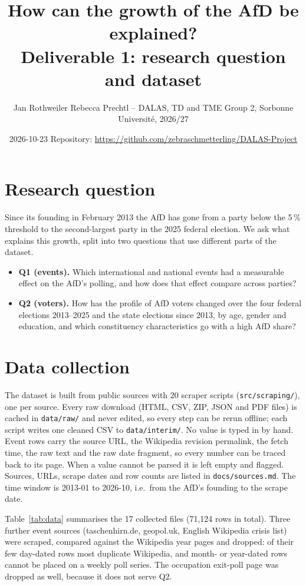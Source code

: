 \documentclass[10pt,a4paper]{article}
\title{\vspace{-2.2em}\large\textbf{How can the growth of the AfD be explained?}\\
\normalsize Deliverable 1: research question and dataset\vspace{-0.6em}}
\author{\small Jan Rothweiler \quad Rebecca Prechtl \quad -- \quad DALAS, TD and TME Group 2, Sorbonne Universit\'e, 2026/27}
\date{\small 2026-10-23 \quad Repository: \url{https://github.com/zebraschmetterling/DALAS-Project}}
\newcommand{\code}[1]{\texttt{\small #1}}
\begin{document}
\maketitle
\vspace{-1.8em}

\section*{Research question}
Since its founding in February 2013 the AfD has gone from a party below the 5\,\% threshold to the second-largest
party in the 2025 federal election. We ask what explains this growth, split into two questions that use different parts of the dataset.
\begin{itemize}
  \item \textbf{Q1 (events).} Which international and national events had a measurable effect on the AfD's
  polling, and how does that effect compare across parties?
  \item \textbf{Q2 (voters).} How has the profile of AfD voters changed over the four federal elections
  2013--2025 and the state elections since 2013, by age, gender and education, and which constituency
  characteristics go with a high AfD share?
\end{itemize}

\section*{Data collection}
The dataset is built from public sources with 20 scraper scripts (\code{src/scraping/}), one per source.
Every raw download (HTML, CSV, ZIP, JSON and PDF files) is cached in \code{data/raw/} and never edited, so every
step can be rerun offline; each script writes one cleaned CSV to \code{data/interim/}. No value is typed in by hand.
Event rows carry the source URL, the Wikipedia revision permalink, the fetch time, the raw text and the raw date fragment,
so every number can be traced back to its page. When a value cannot be parsed it is left empty and flagged.
Sources, URLs, scrape dates and row counts are listed in \code{docs/sources.md}. The time window is 2013-01 to 2026-10, i.e.\ from the AfD's founding to the scrape date.

Table~\ref{tab:data} summarises the 17 collected files (71{,}124 rows in total). Three further event sources (taschenhirn.de,
geopol.uk, English Wikipedia crisis list) were scraped, compared against the Wikipedia year pages and dropped: of their few day-dated rows most duplicate Wikipedia, and month- or year-dated rows cannot be placed on a weekly poll series. The occupation exit-poll page was dropped as well, because it does not serve Q2.
\end{document}
